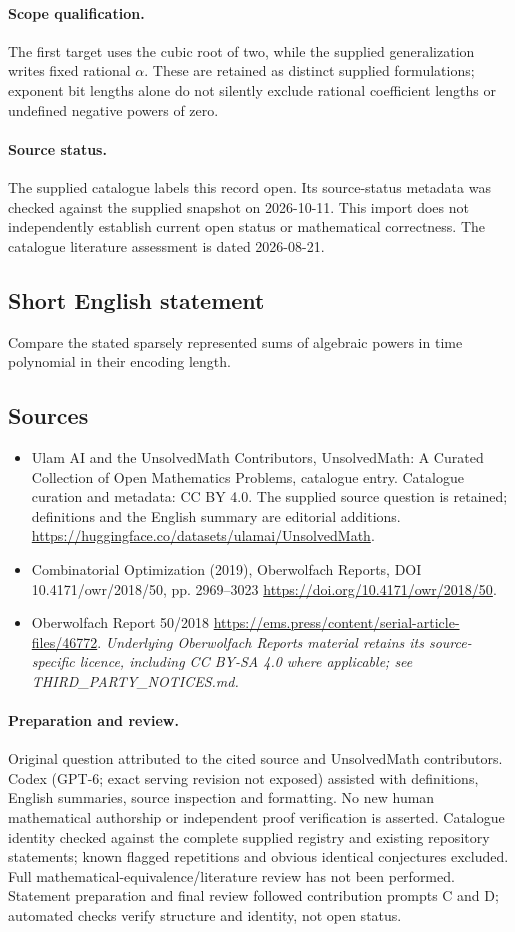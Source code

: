 \documentclass[11pt]{article}
\begin{document}
\paragraph{Scope qualification.}
The first target uses the cubic root of two, while the supplied generalization writes fixed rational $\alpha$. These are retained as distinct supplied formulations; exponent bit lengths alone do not silently exclude rational coefficient lengths or undefined negative powers of zero.
\paragraph{Source status.}
The supplied catalogue labels this record open. Its source-status metadata was checked against the supplied snapshot on 2026-10-11. This import does not independently establish current open status or mathematical correctness. The catalogue literature assessment is dated 2026-08-21.
\subsection{Short English statement}
Compare the stated sparsely represented sums of algebraic powers in time polynomial in their encoding length.
\subsection{Sources}
\begin{itemize}
\item[S1] Ulam AI and the UnsolvedMath Contributors, UnsolvedMath: A Curated Collection of Open Mathematics Problems, catalogue entry. Catalogue curation and metadata: CC BY 4.0. The supplied source question is retained; definitions and the English summary are editorial additions.
\url{https://huggingface.co/datasets/ulamai/UnsolvedMath}.
\item[S2] Combinatorial Optimization (2019), Oberwolfach Reports, DOI 10.4171/owr/2018/50, pp. 2969--3023
\url{https://doi.org/10.4171/owr/2018/50}.
\item[S3] Oberwolfach Report 50/2018
\url{https://ems.press/content/serial-article-files/46772}.
\textit{Underlying Oberwolfach Reports material retains its source-specific licence, including CC BY-SA 4.0 where applicable; see THIRD\_PARTY\_NOTICES.md.}
\end{itemize}
\paragraph{Preparation and review.}
Original question attributed to the cited source and UnsolvedMath contributors. Codex (GPT-6; exact serving revision not exposed) assisted with definitions, English summaries, source inspection and formatting. No new human mathematical authorship or independent proof verification is asserted. Catalogue identity checked against the complete supplied registry and existing repository statements; known flagged repetitions and obvious identical conjectures excluded. Full mathematical-equivalence/literature review has not been performed. Statement preparation and final review followed contribution prompts C and D; automated checks verify structure and identity, not open status.
\label{end:statement}
\end{document}
